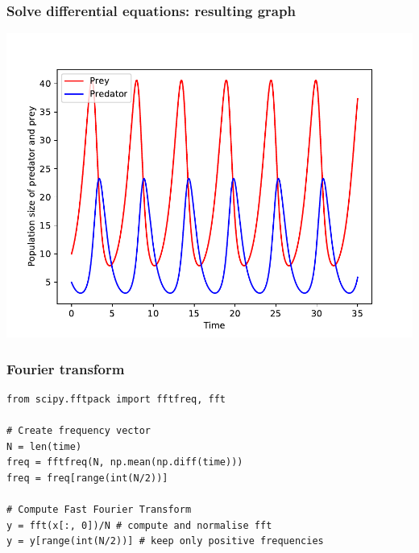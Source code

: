 \documentclass[xcolor=table]{beamer}
\begin{document}
\begin{frame}[fragile]
\frametitle{Solve differential equations: resulting graph}
\begin{center}
	\includegraphics[width=\textwidth]{predator_prey.pdf}
\end{center}

\end{frame}

\begin{frame}[fragile]
\frametitle{Fourier transform}

\begin{lstlisting}[style=python]
from scipy.fftpack import fftfreq, fft

# Create frequency vector
N = len(time)
freq = fftfreq(N, np.mean(np.diff(time)))
freq = freq[range(int(N/2))]

# Compute Fast Fourier Transform
y = fft(x[:, 0])/N # compute and normalise fft
y = y[range(int(N/2))] # keep only positive frequencies
\end{lstlisting}

\end{frame}
\end{document}
